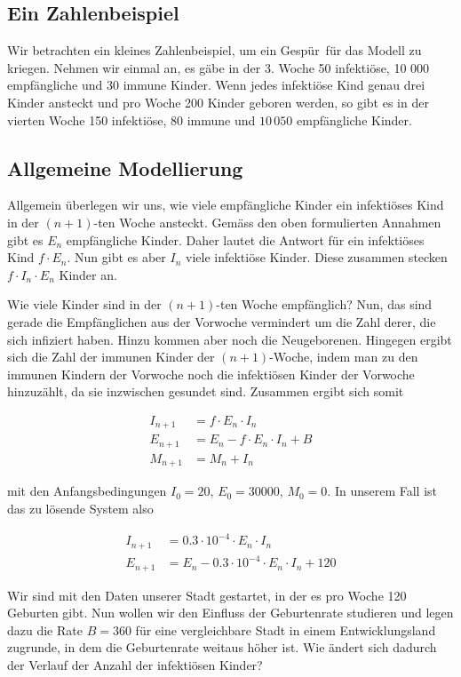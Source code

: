 \documentclass[%
11pt,%
twoside,%
titlepage,%
german,%
headsepline%
]{scrartcl}
\begin{document}
\subsection*{Ein Zahlenbeispiel}

Wir betrachten ein kleines Zahlenbeispiel, um ein \glqq Gespür\grqq\ für das Modell zu kriegen. Nehmen wir einmal an, es gäbe in der 3. Woche 50 infektiöse, 10 000 empfängliche und 30 immune Kinder. Wenn jedes infektiöse Kind genau drei Kinder ansteckt und pro Woche 200 Kinder geboren werden, so gibt es in der vierten Woche 150 infektiöse, 80 immune und $10\,050$ empfängliche Kinder.

\subsection{Allgemeine Modellierung}

Allgemein überlegen wir uns, wie viele empfängliche Kinder ein infektiöses Kind in der $(n+ 1)$-ten Woche ansteckt. Gemäss den oben formulierten Annahmen gibt es $E_n$ empfängliche Kinder. Daher lautet die Antwort für ein infektiöses Kind $f\cdot E_n$. Nun gibt es aber $I_n$ viele infektiöse Kinder. Diese zusammen stecken $f\cdot I_n\cdot E_n$ Kinder an.

Wie viele Kinder sind in der $(n+1)$-ten Woche empfänglich? Nun, das sind gerade die Empfänglichen aus der Vorwoche vermindert um die Zahl derer, die sich infiziert haben. Hinzu kommen aber noch die Neugeborenen. Hingegen ergibt sich die Zahl der immunen Kinder der $(n+1)$-Woche, indem man zu den immunen Kindern der Vorwoche noch die infektiösen Kinder der Vorwoche hinzuzählt, da sie inzwischen gesundet sind. Zusammen ergibt sich somit

\begin{align*}
I_{n+1} &= f\cdot E_n\cdot I_n\\
E_{n+1} &= E_n-f\cdot E_n\cdot I_n+B\\
M_{n+1} &= M_n+I_n
\end{align*}

mit den Anfangsbedingungen $I_0=20$, $E_0=30000$, $M_0=0$. In unserem Fall ist das zu lösende System also

\begin{align*}
I_{n+1} &= 0.3\cdot10^{-4}\cdot E_n\cdot I_n\\
E_{n+1} &= E_n-0.3\cdot10^{-4}\cdot E_n\cdot I_n+120
\end{align*}

Wir sind mit den Daten unserer Stadt gestartet, in der es pro Woche 120 Geburten gibt. Nun wollen wir den Einfluss der Geburtenrate studieren und legen dazu die Rate $B=360$ für eine vergleichbare Stadt in einem Entwicklungsland zugrunde, in dem die Geburtenrate weitaus höher ist. Wie ändert sich dadurch der Verlauf der Anzahl der infektiösen Kinder?
\end{document}
